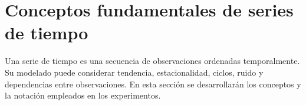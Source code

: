 \section{Conceptos fundamentales de series de tiempo}

Una serie de tiempo es una secuencia de observaciones ordenadas temporalmente. Su modelado puede considerar tendencia, estacionalidad, ciclos, ruido y dependencias entre observaciones. En esta sección se desarrollarán los conceptos y la notación empleados en los experimentos.

